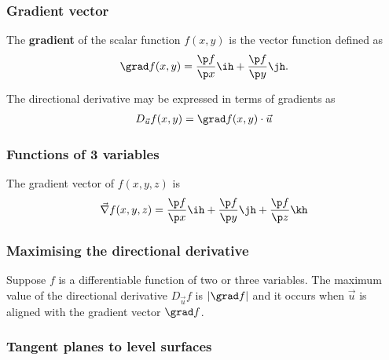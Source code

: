 \documentclass{article}
\begin{document}
\subsubsection{Gradient vector}

\begin{definition}
    The \textbf{gradient} of the scalar function $f(x,y)$ is the vector
    function defined as
    \begin{align*}
        \grad f(x,y)=\frac{\p f}{\p x}\ih + \frac{\p f}{\p y}\jh.
    \end{align*}
\end{definition}
\begin{theorem}
    The directional derivative may be expressed in terms of gradients
    as
    \begin{align*}
        D_{\vec u}f(x,y)=\grad f(x,y)\cdot \vec u
    \end{align*}
\end{theorem}

\subsubsection{Functions of 3 variables}

\begin{definition}
    The gradient vector of $f(x,y,z)$ is
    \begin{align*}
        \vec\nabla f(x,y,z)=\frac{\p f}{\p x}\ih
        + \frac{\p f}{\p y}\jh + \frac{\p f}{\p z}\kh
    \end{align*}
\end{definition}

\subsubsection{Maximising the directional derivative}

\begin{theorem}
    Suppose $f$ is a differentiable function of two or three variables.
    The maximum value of the directional derivative $D_{\vec u}f$ is
    $|\grad f|$ and it occurs when $\vec u$ is aligned with the gradient
    vector $\grad f$.
\end{theorem}

\subsubsection{Tangent planes to level surfaces}
\end{document}
